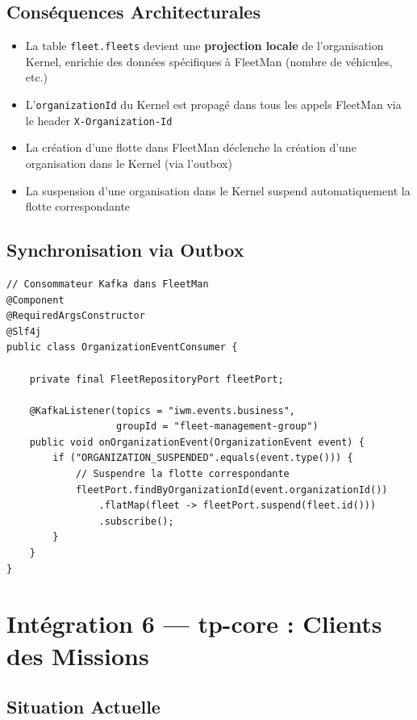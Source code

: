 \documentclass[12pt,a4paper]{report}
\begin{document}
\subsection{Conséquences Architecturales}

\begin{itemize}[leftmargin=2cm]
  \item La table \texttt{fleet.fleets} devient une \textbf{projection locale} de l'organisation Kernel, enrichie des données spécifiques à FleetMan (nombre de véhicules, etc.)
  \item L'\texttt{organizationId} du Kernel est propagé dans tous les appels FleetMan via le header \texttt{X-Organization-Id}
  \item La création d'une flotte dans FleetMan déclenche la création d'une organisation dans le Kernel (via l'outbox)
  \item La suspension d'une organisation dans le Kernel suspend automatiquement la flotte correspondante
\end{itemize}

\subsection{Synchronisation via Outbox}

\begin{lstlisting}[style=javaStyle, caption={Synchronisation flotte-organisation via événements Kafka}]
// Consommateur Kafka dans FleetMan
@Component
@RequiredArgsConstructor
@Slf4j
public class OrganizationEventConsumer {

    private final FleetRepositoryPort fleetPort;

    @KafkaListener(topics = "iwm.events.business",
                   groupId = "fleet-management-group")
    public void onOrganizationEvent(OrganizationEvent event) {
        if ("ORGANIZATION_SUSPENDED".equals(event.type())) {
            // Suspendre la flotte correspondante
            fleetPort.findByOrganizationId(event.organizationId())
                .flatMap(fleet -> fleetPort.suspend(fleet.id()))
                .subscribe();
        }
    }
}
\end{lstlisting}

\section{Intégration 6 — tp-core : Clients des Missions}

\subsection{Situation Actuelle}
\end{document}

